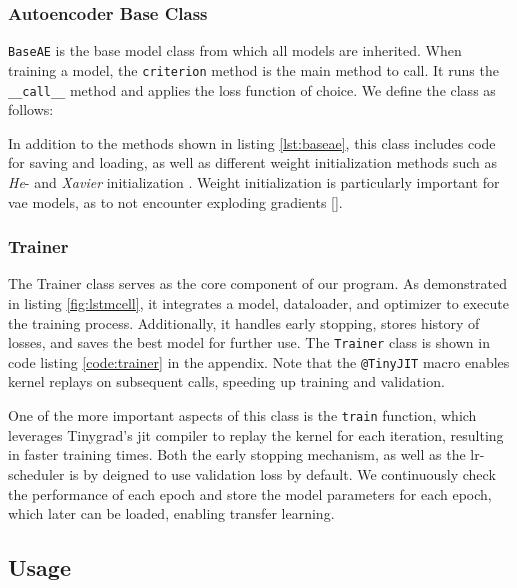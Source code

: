 \subsubsection{Autoencoder Base Class}

\lstinline{BaseAE} is the base model class from which all models are inherited. When training a model, the \lstinline{criterion} method is the main method to call. It runs the \lstinline{__call__} method and applies the loss function of choice. We define the class as follows:



In addition to the methods shown in listing \ref{lst:baseae}, this class includes code for saving and loading, as well as different weight initialization methods such as \textit{He}- and \textit{Xavier} initialization \cite{kumar2017weight}. Weight initialization is particularly important for \acrshort{vae} models, as to not encounter exploding gradients []. 

\subsubsection{Trainer}

The Trainer class serves as the core component of our program. As demonstrated in listing \ref{fig:lstmcell}, it integrates a model, dataloader, and optimizer to execute the training process. Additionally, it handles early stopping, stores history of losses, and saves the best model for further use. The \texttt{Trainer} class is shown in code listing \ref{code:trainer} in the appendix. Note that the \texttt{@TinyJIT} macro enables kernel replays on subsequent calls, speeding up training and validation. 



One of the more important aspects of this class is the \texttt{train} function, which leverages Tinygrad's \acrshort{jit} compiler to replay the kernel for each iteration, resulting in faster training times. Both the early stopping mechanism, as well as the lr-scheduler is by deigned to use validation loss by default. We continuously check the performance of each epoch and store the model parameters for each epoch, which later can be loaded, enabling transfer learning.


\subsection{Usage}

